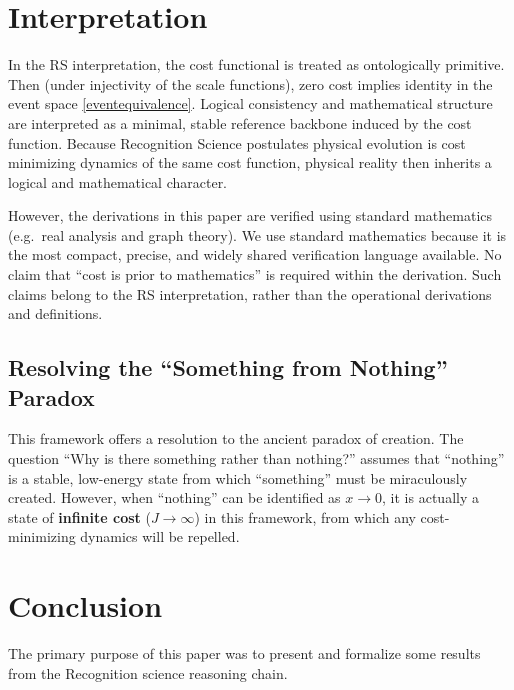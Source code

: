 \documentclass[11pt,a4paper]{article}
\begin{document}
\section{Interpretation}
 In the RS interpretation, the cost functional is treated as ontologically primitive. Then (under injectivity of the scale functions), zero cost implies identity in the event space \ref{eventequivalence}. Logical consistency and mathematical structure are interpreted as a minimal, stable reference backbone induced by the cost function. Because Recognition Science postulates physical evolution is cost minimizing dynamics of the same cost function, physical reality then inherits a logical and mathematical character.

However, the derivations in this paper are verified using standard mathematics (e.g.\ real analysis and graph theory). We use standard mathematics because it is the most compact, precise, and
widely shared verification language available. No claim that ``cost is prior to mathematics'' is required within the derivation. Such claims belong to the RS interpretation, rather than the operational derivations and definitions.
\subsection{Resolving the ``Something from Nothing'' Paradox}
This framework offers a resolution to the ancient paradox of creation. The question ``Why is there something rather than nothing?'' assumes that ``nothing'' is a stable, low-energy state from which ``something'' must be miraculously created. However, when ``nothing'' can be identified as $x \to 0$, it is actually a state of \textbf{infinite cost} ($J \to \infty$) in this framework, from which any cost-minimizing dynamics will be repelled. 
\section{Conclusion}
The primary purpose of this paper was to present and formalize some results from the Recognition science reasoning chain.
\end{document}
